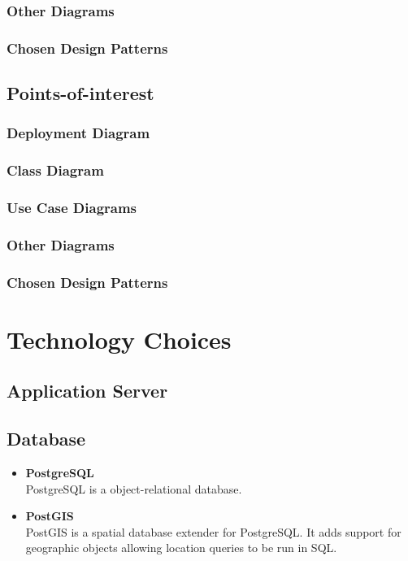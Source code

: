 \documentclass{article}
\begin{document}
        \subsubsection{Other Diagrams}
        \subsubsection{Chosen Design Patterns}
    \subsection{Points-of-interest}
        \subsubsection{Deployment Diagram}
        \subsubsection{Class Diagram}
        \subsubsection{Use Case Diagrams}
        \subsubsection{Other Diagrams}
        \subsubsection{Chosen Design Patterns}
\section{Technology Choices}
\subsection{Application Server}

\subsection{Database}
\begin{itemize}
	\item \textbf{PostgreSQL} \\
	PostgreSQL is a object-relational database. 

	\item \textbf{PostGIS} \\
	PostGIS is a spatial database extender for PostgreSQL. It adds support for geographic objects allowing location queries to be run in SQL.
\end{itemize}
\end{document}
